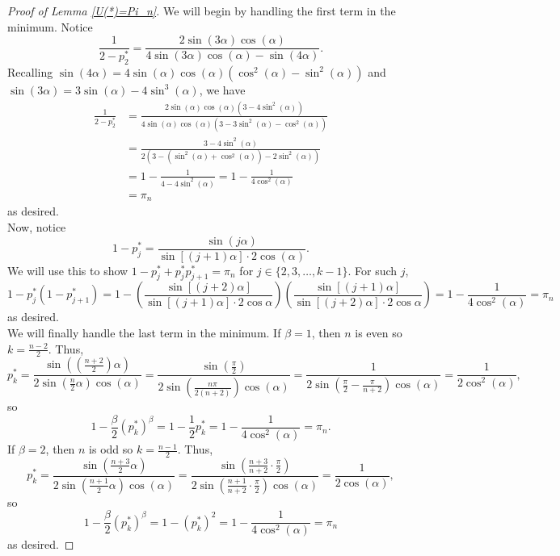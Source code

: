\documentclass[10pt,a4paper]{amsart}
\begin{document}
\begin{proof}[Proof of Lemma \ref{U(*)=Pi_n}]
    We will begin by handling the first term in the minimum. Notice
    $$\frac{1}{2-p_2^*} = \frac{2\sin(3\alpha)\cos(\alpha)}{4\sin(3\alpha)\cos(\alpha) - \sin(4\alpha)}.$$
    Recalling $\sin(4\alpha) = 4\sin(\alpha)\cos(\alpha)\left( \cos^2(\alpha) - \sin^2(\alpha) \right)$ and $\sin(3\alpha) = 3\sin(\alpha) - 4\sin^3(\alpha)$, we have
    \begin{align*}
        \frac{1}{2-p_2^*} &= \frac{2\sin(\alpha)\cos(\alpha) \left(3-4\sin^2(\alpha) \right)}{4\sin(\alpha)\cos(\alpha) \left( 3-3\sin^2(\alpha)-\cos^2(\alpha) \right)} \\
        &= \frac{3-4\sin^2(\alpha)}{2\left( 3 - \left(\sin^2(\alpha)+ \cos^2(\alpha) \right) -2\sin^2(\alpha) \right)} \\
        &= 1 - \frac{1}{4-4\sin^2(\alpha)} = 1-\frac{1}{4\cos^2(\alpha)} \\
        &= \pi_n
    \end{align*}
    as desired.
    \\ Now, notice
    $$1-p_j^* = \frac{\sin(j\alpha)}{\sin\left[ (j+1)\alpha \right] \cdot 2\cos(\alpha)}.$$
    We will use this to show $1-p_j^*+p_j^*p_{j+1}^* = \pi_n$ for $j \in \{ 2,3,\dots,k-1 \}$. For such $j$,
    $$1-p_j^*(1-p_{j+1}^*) = 1-\left( \frac{\sin\left[ (j+2)\alpha \right]}{\sin\left[ (j+1)\alpha \right] \cdot 2\cos\alpha} \right) \left( \frac{\sin[(j+1)\alpha]}{\sin[(j+2)\alpha] \cdot 2\cos \alpha} \right) = 1-\frac{1}{4\cos^2(\alpha)} = \pi_n$$
    as desired.
    \\ We will finally handle the last term in the minimum. If $\beta = 1$, then $n$ is even so $k = \frac{n-2}{2}$. Thus,
    $$p_k^* = \frac{\sin\left( \left(\frac{n+2}{2} \right) \alpha \right)}{2\sin \left( \frac{n}{2} \alpha \right) \cos(\alpha)} = \frac{\sin\left( \frac{\pi}{2} \right)}{2\sin \left( \frac{n\pi}{2(n+2)} \right)\cos(\alpha)} = \frac{1}{2\sin\left( \frac{\pi}{2} - \frac{\pi}{n+2} \right) \cos(\alpha)} = \frac{1}{2\cos^2(\alpha)},$$
    so
    $$1-\frac{\beta}{2}(p_k^*)^\beta = 1-\frac{1}{2}p_k^* = 1- \frac{1}{4\cos^2(\alpha)} = \pi_n.$$
    If $\beta = 2$, then $n$ is odd so $k = \frac{n-1}{2}$. Thus,
    $$p_k^* = \frac{\sin\left( \frac{n+3}{2} \alpha\right)}{2\sin\left( \frac{n+1}{2} \alpha \right) \cos(\alpha)} = \frac{\sin\left( \frac{n+3}{n+2} \cdot \frac{\pi}{2} \right)}{2\sin\left( \frac{n+1}{n+2} \cdot \frac{\pi}{2} \right) \cos(\alpha)} = \frac{1}{2\cos(\alpha)},$$
    so
    $$1-\frac{\beta}{2}(p_k^*)^\beta = 1-(p_k^*)^2 = 1-\frac{1}{4\cos^2(\alpha)} = \pi_n$$
    as desired.
\end{proof}
\end{document}
